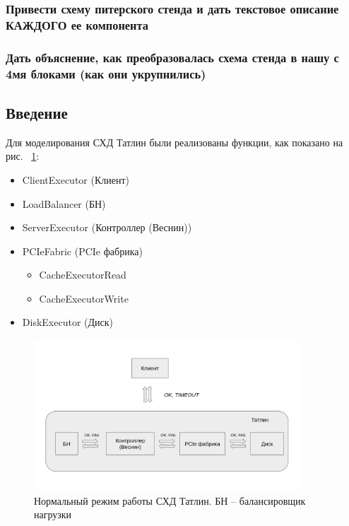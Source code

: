 \subsubsection{Привести схему питерского стенда и дать текстовое описание КАЖДОГО ее компонента}

\subsubsection{Дать объяснение, как преобразовалась схема стенда в нашу с 4мя блоками (как они укрупнились)}


\subsection{Введение}

Для моделирования СХД Татлин были реализованы функции, как показано на рис.  ~\ref{fig:norm-tatlin}:

\begin{itemize}
\item ClientExecutor (Клиент) 
\item LoadBalancer (БН)
\item ServerExecutor (Контроллер (Веснин))
\item PCIeFabric (PCIe фабрика)
\begin{itemize}
\item CacheExecutorRead
\item CacheExecutorWrite
\end{itemize}
\item DiskExecutor (Диск)
\end{itemize}



\begin{figure}[!ht]
\centering
\includegraphics[width=10cm]{Kenenbek/images/norm.png}
\caption{Нормальный режим работы СХД Татлин. БН -- балансировщик нагрузки}
\label{fig:norm-tatlin}
\end{figure}

